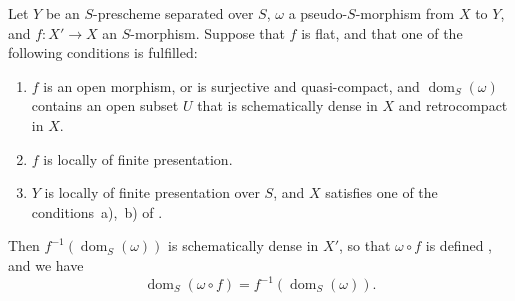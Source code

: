 \begin{proposition}[20.3.11]
\label{IV.20.3.11}
Let $Y$ be an $S$-prescheme separated over $S$, $\omega$ a pseudo-$S$-morphism from $X$ to $Y$, and $f:X'\to X$ an $S$-morphism.
Suppose that $f$ is flat, and that one of the following conditions is fulfilled:
\begin{enumerate}[label=\emph{(\roman*)}]
  \item $f$ is an open morphism, or is surjective and quasi-compact, and $\operatorname{dom}_S(\omega)$ contains an open subset $U$ that is schematically dense in $X$ and retrocompact in $X$.
  \item $f$ is locally of finite presentation.
  \item $Y$ is locally of finite presentation over $S$, and $X$ satisfies one of the conditions~a),~b) of .
\end{enumerate}
Then $f^{-1}(\operatorname{dom}_S(\omega))$ is schematically dense in $X'$, so that $\omega\circ f$ is defined , and we have
\[
\label{IV.20.3.11.1}
  \operatorname{dom}_S(\omega\circ f)=f^{-1}(\operatorname{dom}_S(\omega)).
  \tag{20.3.11.1}
\]
\end{proposition}

